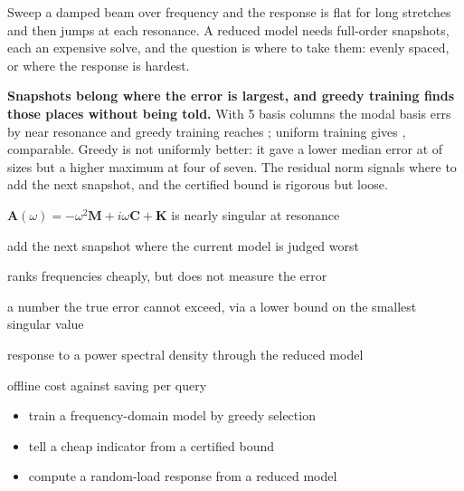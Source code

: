 \newpage\thispagestyle{hl}
\begin{hlquote}Sweep a damped beam over frequency and the response is flat for long stretches and then jumps at each resonance. A reduced model needs full-order snapshots, each an expensive solve, and the question is where to take them: evenly spaced, or where the response is hardest.\end{hlquote}
\vspace{8pt}\begin{hlsum}\textbf{Snapshots belong where the error is largest, and greedy training finds those places without being told.} With 5 basis columns the modal basis errs by \cfrModalNearFive{} near resonance and greedy training reaches \cfrGreedyNearFive; uniform training gives \cfrUniformNearFive, comparable. Greedy is not uniformly better: it gave a lower median error at \cfrGreedyWinsMed{} of \cfrRankCount{} sizes but a higher maximum at four of seven. The residual norm signals where to add the next snapshot, and the certified bound is rigorous but loose.\end{hlsum}
\begin{description}\setlength\itemsep{5pt}\setlength\parsep{0pt}\renewcommand{\descriptionlabel}[1]{\hspace{\labelsep}\sffamily\bfseries\color{hlnavy}#1}
\item[Frequency-dependent operator] $\bm A(\omega)=-\omega^2\bm M+i\omega\bm C+\bm K$ is nearly singular at resonance
\item[Greedy training] add the next snapshot where the current model is judged worst
\item[Error indicator] ranks frequencies cheaply, but does not measure the error
\item[Certified bound] a number the true error cannot exceed, via a lower bound on the smallest singular value
\item[Random vibration] response to a power spectral density through the reduced model
\item[Break-even] offline cost against saving per query
\end{description}
\begin{itemize}\setlength\itemsep{3pt}
\item train a frequency-domain model by greedy selection
\item tell a cheap indicator from a certified bound
\item compute a random-load response from a reduced model
\end{itemize}
